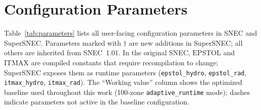 \documentclass[twocolumn,linenumbers]{aastex701}
\begin{document}
\section{Configuration Parameters}
\label{sec:parameters}

Table~\ref{tab:parameters} lists all user-facing configuration parameters in SNEC and SuperSNEC. Parameters marked with $\dagger$ are new additions in SuperSNEC; all others are inherited from SNEC~1.01. In the original SNEC, $\mathrm{EPSTOL}$ and $\mathrm{ITMAX}$ are compiled constants that require recompilation to change; SuperSNEC exposes them as runtime parameters (\texttt{epstol\_hydro}, \texttt{epstol\_rad}, \texttt{itmax\_hydro}, \texttt{itmax\_rad}). The ``Working value'' column shows the optimized baseline used throughout this work (100-zone \texttt{adaptive\_\-runtime} mode); dashes indicate parameters not active in the baseline configuration.









\end{document}
